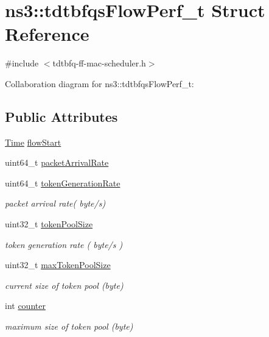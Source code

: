 \hypertarget{structns3_1_1tdtbfqsFlowPerf__t}{}\section{ns3\+:\+:tdtbfqs\+Flow\+Perf\+\_\+t Struct Reference}
\label{structns3_1_1tdtbfqsFlowPerf__t}


{\ttfamily \#include $<$tdtbfq-\/ff-\/mac-\/scheduler.\+h$>$}



Collaboration diagram for ns3\+:\+:tdtbfqs\+Flow\+Perf\+\_\+t\+:
\subsection*{Public Attributes}
\begin{DoxyCompactItemize}
\item 
\hyperlink{classns3_1_1Time}{Time} \hyperlink{structns3_1_1tdtbfqsFlowPerf__t_aa056fca6cc6c820bbd6befcfc70b3672}{flow\+Start}
\item 
uint64\+\_\+t \hyperlink{structns3_1_1tdtbfqsFlowPerf__t_a7b8d68ca2862858a61d2707300e5b236}{packet\+Arrival\+Rate}
\item 
uint64\+\_\+t \hyperlink{structns3_1_1tdtbfqsFlowPerf__t_a9957bcf92996d008cd8752debbe8385a}{token\+Generation\+Rate}
\begin{DoxyCompactList}\small\item\em packet arrival rate( byte/s) \end{DoxyCompactList}\item 
uint32\+\_\+t \hyperlink{structns3_1_1tdtbfqsFlowPerf__t_a0018ebbc62638f00f2b65dea4175acc4}{token\+Pool\+Size}
\begin{DoxyCompactList}\small\item\em token generation rate ( byte/s ) \end{DoxyCompactList}\item 
uint32\+\_\+t \hyperlink{structns3_1_1tdtbfqsFlowPerf__t_a17bdf39e867e790ec25a5e41c975316a}{max\+Token\+Pool\+Size}
\begin{DoxyCompactList}\small\item\em current size of token pool (byte) \end{DoxyCompactList}\item 
int \hyperlink{structns3_1_1tdtbfqsFlowPerf__t_a25cdf10b4de642a11eaa4cc3d79bead0}{counter}
\begin{DoxyCompactList}\small\item\em maximum size of token pool (byte) \end{DoxyCompactList}\item 

\end{DoxyCompactItemize}
